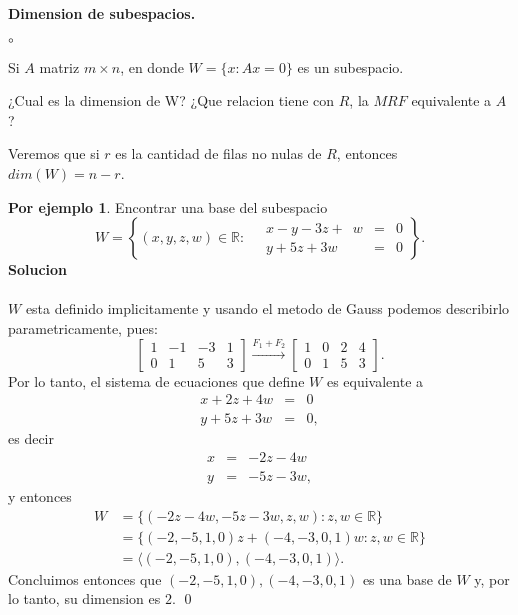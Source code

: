 \documentclass{article}
\theoremstyle{definition}
\theoremstyle{definition}
\newtheorem*{ej}{Por ejemplo}
\theoremstyle{remark}
\begin{document}
\begin{center}
\textbf{Dimension de subespacios.}
\end{center}
\begin{list}{$\circ$}{}  
\item Si $A$ matriz $m \times n$, en donde $W=\{x : Ax=0\}$ es un subespacio. 
\item ¿Cual es la dimension de W? ¿Que relacion tiene con $R$, la $MRF$ equivalente a $A$? 
\item Veremos que si $r$ es la cantidad de filas no nulas de $R$, entonces \\ $dim(W)=n-r$.
\end{list}
\begin{ej}
  Encontrar una base del subespacio \[
    W=\left\{(x,y,z,w) \in \mathbb{R} : \quad 
      \begin{array}{rcr}
        x-y-3z+\phantom{3}w  & = &  0 \\
        y + 5z+3w  & = &  0 
\end{array}\right\}.
  \]
  \textbf{Solucion}\\\\
  $W$ esta definido implicitamente y usando el metodo de Gauss podemos describirlo parametricamente, pues: \[
    \begin{bmatrix}1 & -1 & -3 & 1 \\ 0 & 1 & 5 & 3 \end{bmatrix} \xrightarrow{F_1+F_2}\begin{bmatrix}1 & 0 & 2 & 4 \\ 0 & 1 & 5 & 3 \end{bmatrix}.
  \]
  Por lo tanto, el sistema de ecuaciones que define $W$ es equivalente a \[
    \begin{array}{rcr}x+2z+4w & = & 0\phantom{,}\\
      y+5z+3w & = & 0,
    \end{array}
  \]
  es decir
  \[
    \begin{array}{rcr}
      x & = & -2z- 4w \phantom{,}\\
      y &=& - 5z- 3w ,
    \end{array}
  \]
   y entonces \[
     \begin{aligned}
       W &= \{(-2z-4w,-5z-3w,z,w) : z,w \in \mathbb{R}\} \\
         &=\{(-2,-5,1,0)z+(-4,-3,0,1)w:z,w \in \mathbb{R}\} \\ &= \langle (-2,-5,1,0),(-4,-3,0,1)\rangle. 
     \end{aligned}
   \]
   Concluimos entonces que $(-2,-5,1,0),(-4,-3,0,1)$ es una base de $W$ y, por lo tanto, su dimension es $2$. \qed
\end{ej}
\pagebreak
\end{document}
